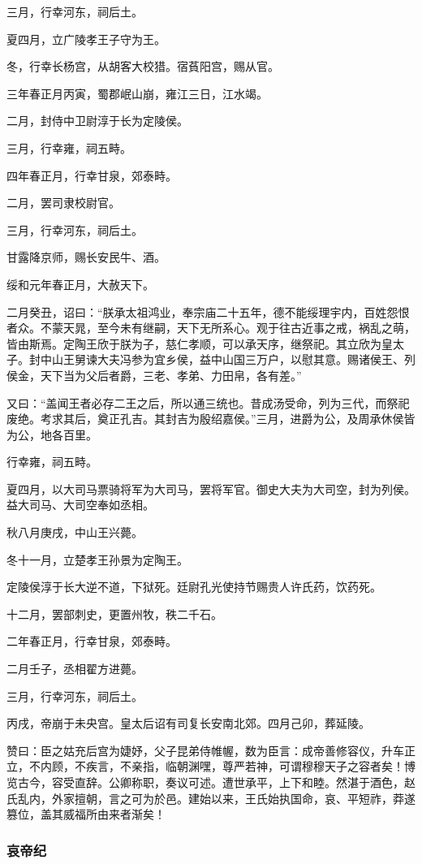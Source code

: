 \documentclass[]{article}
\begin{document}
三月，行幸河东，祠后土。

夏四月，立广陵孝王子守为王。

冬，行幸长杨宫，从胡客大校猎。宿萯阳宫，赐从官。

三年春正月丙寅，蜀郡岷山崩，雍江三日，江水竭。

二月，封侍中卫尉淳于长为定陵侯。

三月，行幸雍，祠五畤。

四年春正月，行幸甘泉，郊泰畤。

二月，罢司隶校尉官。

三月，行幸河东，祠后土。

甘露降京师，赐长安民牛、酒。

绥和元年春正月，大赦天下。

二月癸丑，诏曰：``朕承太祖鸿业，奉宗庙二十五年，德不能绥理宇内，百姓怨恨者众。不蒙天晁，至今未有继嗣，天下无所系心。观于往古近事之戒，祸乱之萌，皆由斯焉。定陶王欣于朕为子，慈仁孝顺，可以承天序，继祭祀。其立欣为皇太子。封中山王舅谏大夫冯参为宜乡侯，益中山国三万户，以慰其意。赐诸侯王、列侯金，天下当为父后者爵，三老、孝弟、力田帛，各有差。''

又曰：``盖闻王者必存二王之后，所以通三统也。昔成汤受命，列为三代，而祭祀废绝。考求其后，奠正孔吉。其封吉为殷绍嘉侯。''三月，进爵为公，及周承休侯皆为公，地各百里。

行幸雍，祠五畤。

夏四月，以大司马票骑将军为大司马，罢将军官。御史大夫为大司空，封为列侯。益大司马、大司空奉如丞相。

秋八月庚戌，中山王兴薨。

冬十一月，立楚孝王孙景为定陶王。

定陵侯淳于长大逆不道，下狱死。廷尉孔光使持节赐贵人许氏药，饮药死。

十二月，罢部刺史，更置州牧，秩二千石。

二年春正月，行幸甘泉，郊泰畤。

二月壬子，丞相翟方进薨。

三月，行幸河东，祠后土。

丙戌，帝崩于未央宫。皇太后诏有司复长安南北郊。四月己卯，葬延陵。

赞曰：臣之姑充后宫为婕妤，父子昆弟侍帷幄，数为臣言：成帝善修容仪，升车正立，不内顾，不疾言，不亲指，临朝渊嘿，尊严若神，可谓穆穆天子之容者矣！博览古今，容受直辞。公卿称职，奏议可述。遭世承平，上下和睦。然湛于酒色，赵氏乱内，外家擅朝，言之可为於邑。建始以来，王氏始执国命，哀、平短祚，莽遂篡位，盖其威福所由来者渐矣！

\hypertarget{header-n1105}{%
\subsubsection{哀帝纪}\label{header-n1105}}
\end{document}
